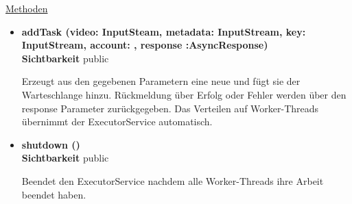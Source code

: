 \underline{Methoden}
\begin{itemize}
\itemsep0pt
\item \textbf{addTask (video: InputSteam, metadata: InputStream, 
key: InputStream, account: , response :AsyncResponse)}\hfill\\
\textbf{Sichtbarkeit} public

Erzeugt aus den gegebenen Parametern eine neue  und fügt sie der Warteschlange hinzu. Rückmeldung über Erfolg oder Fehler werden über den response Parameter zurückgegeben. Das Verteilen auf Worker-Threads übernimmt der ExecutorService automatisch.

\item \textbf{shutdown ()}\hfill\\
\textbf{Sichtbarkeit} public

Beendet den ExecutorService nachdem alle Worker-Threads ihre Arbeit beendet haben.

\end{itemize}